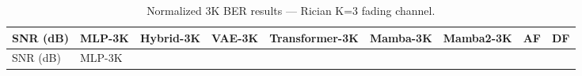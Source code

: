 \documentclass[
  english,
  12pt,
  12pt,
  a4paper,
  oneside]{report}
\begin{document}
\begin{longtable}[]{@{}
  >{\raggedright\arraybackslash}p{}
  >{\raggedright\arraybackslash}p{}
  >{\raggedright\arraybackslash}p{}
  >{\raggedright\arraybackslash}p{}
  >{\raggedright\arraybackslash}p{}
  >{\raggedright\arraybackslash}p{}
  >{\raggedright\arraybackslash}p{}
  >{\raggedright\arraybackslash}p{}
  >{\raggedright\arraybackslash}p{}@{}}
\caption{Normalized 3K BER results --- Rician K=3 fading channel.}\label{tbl:table9}\tabularnewline
\toprule\noalign{}
\begin{minipage}[b]{\linewidth}\raggedright
SNR (dB)
\end{minipage} & \begin{minipage}[b]{\linewidth}\raggedright
MLP-3K
\end{minipage} & \begin{minipage}[b]{\linewidth}\raggedright
Hybrid-3K
\end{minipage} & \begin{minipage}[b]{\linewidth}\raggedright
VAE-3K
\end{minipage} & \begin{minipage}[b]{\linewidth}\raggedright
Transformer-3K
\end{minipage} & \begin{minipage}[b]{\linewidth}\raggedright
Mamba-3K
\end{minipage} & \begin{minipage}[b]{\linewidth}\raggedright
Mamba2-3K
\end{minipage} & \begin{minipage}[b]{\linewidth}\raggedright
AF
\end{minipage} & \begin{minipage}[b]{\linewidth}\raggedright
DF
\end{minipage} \\
\midrule\noalign{}
\endfirsthead
\toprule\noalign{}
\begin{minipage}[b]{\linewidth}\raggedright
SNR (dB)
\end{minipage} & \begin{minipage}[b]{\linewidth}\raggedright
MLP-3K
\end{minipage} & \begin{minipage}[b]{\linewidth}\raggedright

\end{minipage}
\end{longtable}
\end{document}
